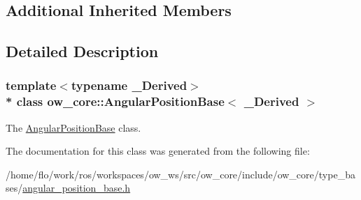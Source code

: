 \subsection*{Additional Inherited Members}


\subsection{Detailed Description}
\subsubsection*{template$<$typename \+\_\+\+Derived$>$\\*
class ow\+\_\+core\+::\+Angular\+Position\+Base$<$ \+\_\+\+Derived $>$}

The \hyperlink{classow__core_1_1AngularPositionBase}{Angular\+Position\+Base} class. 

The documentation for this class was generated from the following file\+:\begin{DoxyCompactItemize}
\item 
/home/flo/work/ros/workspaces/ow\+\_\+ws/src/ow\+\_\+core/include/ow\+\_\+core/type\+\_\+bases/\hyperlink{angular__position__base_8h}{angular\+\_\+position\+\_\+base.\+h}\end{DoxyCompactItemize}
